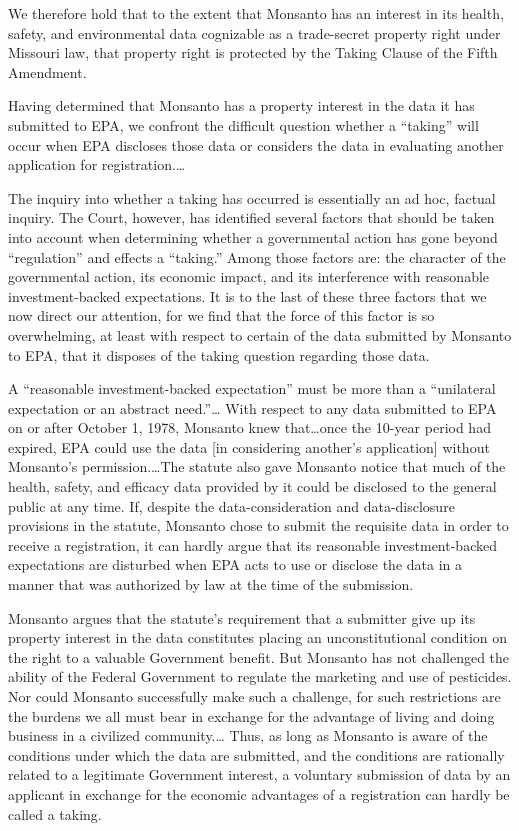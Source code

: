 We therefore hold that to the
extent that Monsanto has an interest in its health, safety, and environmental
data cognizable as a trade-secret property right under Missouri law,  that
property right is protected by the Taking Clause of the Fifth
Amendment.


Having determined that Monsanto has a property interest in the data it has
submitted to EPA, we confront the difficult question whether a ``taking'' will
occur when EPA discloses those data or considers the data in evaluating another
application for registration.\ldots

The inquiry into whether a taking has occurred is essentially an ad
hoc, factual inquiry. The Court,
however, has identified several factors that should be taken into account when
determining whether a governmental action has gone beyond ``regulation'' and
effects a ``taking.'' Among those factors are: the character of the
governmental action, its economic impact, and its interference with reasonable
investment-backed expectations.
It is to the last of these three
factors that we now direct our attention, for we find that the force of this
factor is so overwhelming, at least with respect to certain of the data
submitted by Monsanto to EPA, that it disposes of the taking question regarding
those data.



A ``reasonable investment-backed expectation'' must be more than a ``unilateral
expectation or an abstract need.''\ldots
With respect to any data submitted to EPA on or after October 1, 1978,
Monsanto knew that\ldots once
the 10-year period had expired, EPA could use the data [in considering another's
application] without Monsanto's
permission.\ldots The statute also
gave Monsanto notice that much of the health, safety, and efficacy data provided
by it could be disclosed to the general public at any time. If,
despite the data-consideration and data-disclosure provisions in the statute,
Monsanto chose to submit the requisite data in order to receive a registration,
it can hardly argue that its reasonable investment-backed  expectations are
disturbed when EPA acts to use or disclose the data in a manner that was
authorized by law at the time of the submission.

Monsanto argues that the statute's requirement that a submitter give up its
property interest in the data constitutes placing an unconstitutional condition
on the right to a valuable Government benefit. But
Monsanto has not challenged the ability of the Federal Government to regulate
the marketing and use of pesticides. Nor could Monsanto successfully make such a
challenge, for such restrictions are the burdens we all must bear in exchange
for the advantage of living and doing business in a civilized community.\ldots
Thus, as long as Monsanto is aware of the conditions under which the data are
submitted, and the conditions are rationally related to a legitimate Government
interest, a voluntary submission of data by an applicant in exchange for the
economic advantages of a registration can hardly be called a taking.


